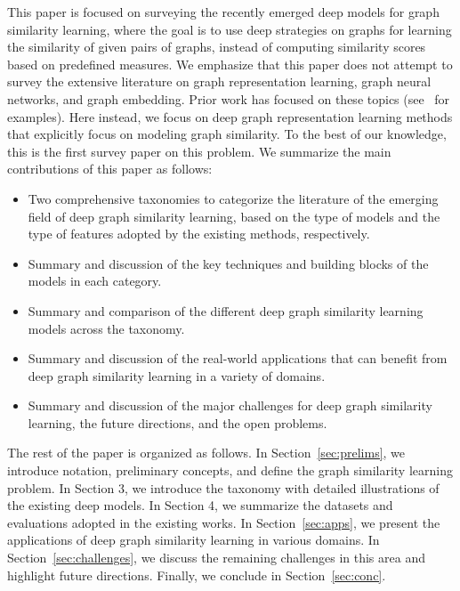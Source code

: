 This paper is focused on surveying the recently emerged deep models for graph similarity learning, where the goal is to use deep strategies on graphs for learning the similarity of given pairs of graphs, instead of computing similarity scores based on predefined measures. We emphasize that this paper does not attempt to survey the extensive literature on graph representation learning, graph neural networks, and graph embedding. Prior work has focused on these topics (see~ for examples). Here instead, we focus on deep graph representation learning methods that explicitly focus on modeling graph similarity. To the best of our knowledge, this is the first survey paper on this problem. We summarize the main contributions of this paper as follows:
\begin{itemize}
    \item[$\circ$] Two comprehensive taxonomies to categorize the literature of the emerging field of deep graph similarity learning, based on the type of models and the type of features adopted by the existing methods, respectively. 
    \item[$\circ$] Summary and discussion of the key techniques and building blocks of the models in each category.
    \item[$\circ$] Summary and comparison of the different deep graph similarity learning models across the taxonomy.
    \item[$\circ$] Summary and discussion of the real-world applications that can benefit from deep graph similarity learning in a variety of domains. 
    \item[$\circ$] Summary and discussion of the major challenges for deep graph similarity learning, the future directions, and the open problems.  
\end{itemize}

The rest of the paper is organized as follows. In Section~\ref{sec:prelims}, we introduce notation, preliminary concepts, and define the graph similarity learning problem. In Section 3, we introduce the taxonomy with detailed illustrations of the existing deep models. In Section 4, we summarize the datasets and evaluations adopted in the existing works. In Section~\ref{sec:apps}, we present the applications of deep graph similarity learning in various domains. In Section~\ref{sec:challenges}, we discuss the remaining challenges in this area and highlight future directions. Finally, we conclude in Section~\ref{sec:conc}.


